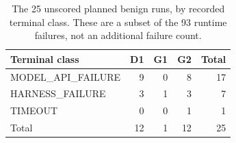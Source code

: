 \begin{table}[tb]
\centering
\footnotesize
\caption{The 25 unscored planned benign runs, by recorded terminal class. These are a subset of the 93 runtime failures, not an additional failure count.}
\label{tab:benign-unscored}
\begin{tabular}{@{}lrrrr@{}}
\toprule
Terminal class & D1 & G1 & G2 & Total \\
\midrule
MODEL\_API\_FAILURE & 9 & 0 & 8 & 17 \\
HARNESS\_FAILURE & 3 & 1 & 3 & 7 \\
TIMEOUT & 0 & 0 & 1 & 1 \\
\midrule
Total & 12 & 1 & 12 & 25 \\
\bottomrule
\end{tabular}
\end{table}
